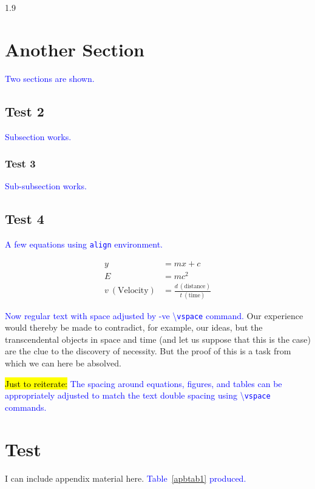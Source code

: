\documentclass[phd]{ndsu-thesis-2022}
\newcommand\myspacing{1.9} %
\newcommand\italk[1]{\textcolor{blue}{#1}}  %
\newcommand\cmd[1]{\textbackslash\texttt{#1}}  %
\begin{document}
\begin{spacing}{\myspacing}
\section{Another Section}
\italk{Two sections are shown.} \kant[7]

\subsection{Test 2}
\italk{Subsection works.}

\subsubsection{Test 3}
\italk{Sub-subsection works.}

\subsection{Test 4}
\italk{A few equations using \texttt{align} environment.}

\begin{align}
y &= mx + c \\
E &= mc^2 \\
v\: (\text{Velocity}) &= \frac{d\: (\text{distance})}{t\: (\text{time})} 
\end{align}

\vspace{-1.5ex}
\italk{Now regular text with space adjusted by -ve \cmd{vspace} command.} Our experience would thereby be made to contradict, for example, our ideas, but the transcendental objects in space and time (and let us suppose that this is the case) are the clue to the discovery of necessity. But the proof of this is a task from which we can here be absolved.

\italk{\hl{Just to reiterate:} The spacing around equations, figures, and tables can be appropriately adjusted to match the text double spacing using \cmd{vspace} commands.}


\section{Test}
I can include appendix material here. \italk{Table~\ref{apbtab1} produced.}


\end{spacing}
\end{document}
